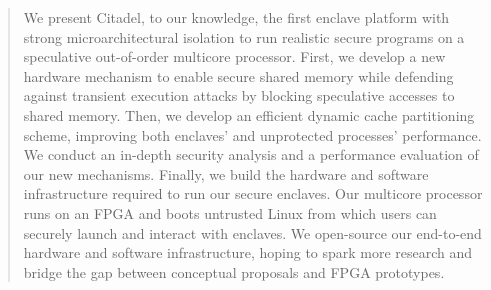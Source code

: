 \begin{abstract}
\vspace{-0.15in}
We present Citadel, to our knowledge, the first enclave platform with strong microarchitectural isolation to run realistic secure programs on a speculative out-of-order multicore processor.
First, we develop a new hardware mechanism to enable secure shared memory while defending against transient execution attacks by blocking speculative accesses to shared memory.
Then, we develop an efficient dynamic cache partitioning scheme, improving both enclaves' and unprotected processes' performance.
We conduct an in-depth security analysis and a performance evaluation of our new mechanisms.
Finally, we build the hardware and software infrastructure required to run our secure enclaves.
Our multicore processor runs on an FPGA and boots untrusted Linux from which users can securely launch and interact with enclaves.
We open-source our end-to-end hardware and software infrastructure, hoping to spark more research and bridge the gap between conceptual proposals and FPGA prototypes.
\end{abstract}
